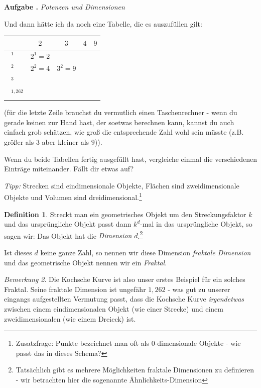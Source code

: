 \documentclass[a4paper,ngerman,12pt]{scrartcl}
\theoremstyle{definition}
\newtheorem{defn}{Definition}[]
\theoremstyle{plain}
\theoremstyle{remark}
\newtheorem{bem}[defn]{Bemerkung}
\newlength{\aufgabenskip}
\newcounter{aufgabennummer}
\newenvironment{aufgabe}[1]{
  \addtocounter{aufgabennummer}{1}
  \textbf{Aufgabe \theaufgabennummer.} \emph{#1} \par
}{\vspace{\aufgabenskip}}
\begin{document}
\begin{aufgabe}{Potenzen und Dimensionen}
Und dann hätte ich da noch eine Tabelle, die es auszufüllen gilt:
\begin{center}
	\renewcommand{\arraystretch}{2}
	\begin{tabular}{l||c|c|c|c}
				      & $2$ & $3$ & $4$ & $9$ \\\hline\hline
		$\boxed{\phantom{1}}^1$  & $2^1=2$	&   &  & \\\hline
		$\boxed{\phantom{1}}^2$  & $2^2=4$	& $3^2=9$ & \phantom{$4^2=16$} & \phantom{$9^2=81$}\\\hline
		$\boxed{\phantom{1}}^3$  & 	&   &  & \\\hline
		$\boxed{\phantom{1}}^{1,262}$  & 	&   &  &     	
	\end{tabular}
\end{center}
(für die letzte Zeile brauchst du vermutlich einen Taschenrechner - wenn du gerade keinen zur Hand hast, der soetwas berechnen kann, kannst du auch einfach grob schätzen, wie groß die entsprechende Zahl wohl sein müsste (z.B. größer als $3$ aber kleiner als $9$)).

Wenn du beide Tabellen fertig ausgefüllt hast, vergleiche einmal die verschiedenen Einträge miteinander. Fällt dir etwas auf?

\emph{Tipp:} Strecken sind eindimensionale Objekte, Flächen sind zweidimensionale Objekte und Volumen sind dreidimensional.\footnote{Zusatzfrage: Punkte bezeichnet man oft als 0-dimensionale Objekte - wie passt das in dieses Schema?}
\end{aufgabe}

\begin{defn}
Streckt man ein geometrisches Objekt um den Streckungsfaktor $k$ und das ursprüngliche Objekt passt dann $k^d$-mal in das ursprüngliche Objekt, so sagen wir: Das Objekt hat die \emph{Dimension $d$}.\footnote{Tatsächlich gibt es mehrere Möglichkeiten fraktale Dimensionen zu definieren - wir betrachten hier die sogenannte \glqq Ähnlichkeits-Dimension\grqq{}}

Ist dieses $d$ keine ganze Zahl, so nennen wir diese Dimension \emph{fraktale Dimension} und das geometrische Objekt nennen wir ein \emph{Fraktal}.
\end{defn}

\begin{bem}
Die Kochsche Kurve ist also unser erstes Beispiel für ein solches Fraktal. Seine fraktale Dimension ist ungefähr $1,262$ - was gut zu unserer eingangs aufgestellten Vermutung passt, dass die Kochsche Kurve \emph{irgendetwas} zwischen einem eindimensionalen Objekt (wie einer Strecke) und einem zweidimensionalen (wie einem Dreieck) ist.
\end{bem}
\end{document}
